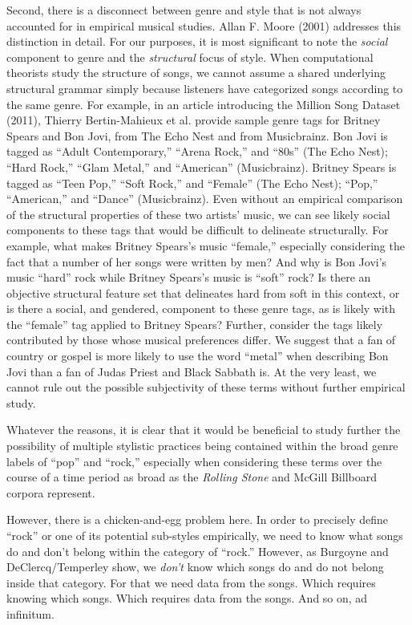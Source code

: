 Second, there is a disconnect between genre and style that is not always accounted for in empirical musical studies. Allan F. Moore (2001) addresses this distinction in detail. For our purposes, it is most significant to note the \emph{social} component to genre and the \emph{structural} focus of style. When computational theorists study the structure of songs, we cannot assume a shared underlying structural grammar simply because listeners have categorized songs according to the same genre. For example, in an article introducing the Million Song Dataset (2011), Thierry Bertin-Mahieux et al. provide sample genre tags for Britney Spears and Bon Jovi, from The Echo Nest and from Musicbrainz. Bon Jovi is tagged as ``Adult Contemporary,'' ``Arena Rock,'' and ``80s'' (The Echo Nest); ``Hard Rock,'' ``Glam Metal,'' and ``American'' (Musicbrainz). Britney Spears is tagged as ``Teen Pop,'' ``Soft Rock,'' and ``Female'' (The Echo Nest); ``Pop,'' ``American,'' and ``Dance'' (Musicbrainz). Even without an empirical comparison of the structural properties of these two artists' music, we can see likely social components to these tags that would be difficult to delineate structurally. For example, what makes Britney Spears's music ``female,'' especially considering the fact that a number of her songs were written by men? And why is Bon Jovi's music ``hard'' rock while Britney Spears's music is ``soft'' rock? Is there an objective structural feature set that delineates hard from soft in this context, or is there a social, and gendered, component to these genre tags, as is likely with the ``female'' tag applied to Britney Spears? Further, consider the tags likely contributed by those whose musical preferences differ. We suggest that a fan of country or gospel is more likely to use the word ``metal'' when describing Bon Jovi than a fan of Judas Priest and Black Sabbath is. At the very least, we cannot rule out the possible subjectivity of these terms without further empirical study.

Whatever the reasons, it is clear that it would be beneficial to study further the possibility of multiple stylistic practices being contained within the broad genre labels of ``pop'' and ``rock,'' especially when considering these terms over the course of a time period as broad as the \emph{Rolling Stone} and McGill Billboard corpora represent.

However, there is a chicken-and-egg problem here. In order to precisely define ``rock'' or one of its potential sub-styles empirically, we need to know what songs do and don't belong within the category of ``rock.'' However, as Burgoyne and DeClercq\slash Temperley show, we \emph{don't} know which songs do and do not belong inside that category. For that we need data from the songs. Which requires knowing which songs. Which requires data from the songs. And so on, ad infinitum.

